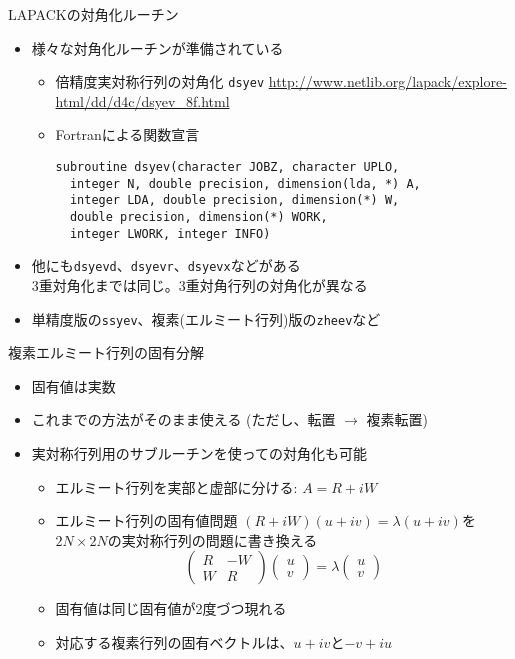 \begin{frame}[t,fragile]{LAPACKの対角化ルーチン}
  \begin{itemize}
  \item 様々な対角化ルーチンが準備されている
    \begin{itemize}
    \item 倍精度実対称行列の対角化 {\tt dsyev}
      \url{http://www.netlib.org/lapack/explore-html/dd/d4c/dsyev_8f.html}
    \item Fortranによる関数宣言
\begin{lstlisting}
subroutine dsyev(character JOBZ, character UPLO,
  integer N, double precision, dimension(lda, *) A,
  integer LDA, double precision, dimension(*) W,
  double precision, dimension(*) WORK,
  integer LWORK, integer INFO)		
\end{lstlisting}
    \end{itemize}
  \item 他にも{\tt dsyevd}、{\tt dsyevr}、{\tt dsyevx}などがある \\
    3重対角化までは同じ。3重対角行列の対角化が異なる
  \item 単精度版の{\tt ssyev}、複素(エルミート行列)版の{\tt zheev}など
  \end{itemize}
\end{frame}

\begin{frame}[t,fragile]{複素エルミート行列の固有分解}
  \begin{itemize}
  \item 固有値は実数
  \item これまでの方法がそのまま使える (ただし、転置 $\rightarrow$ 複素転置)
  \item 実対称行列用のサブルーチンを使っての対角化も可能
    \begin{itemize}
    \item エルミート行列を実部と虚部に分ける: $A = R + iW$
    \item エルミート行列の固有値問題 $(R + iW)(u+iv) = \lambda(u+iv)$を$2N \times 2N$の実対称行列の問題に書き換える
      \[
      \begin{pmatrix} R & -W \\ W & R \end{pmatrix}
      \begin{pmatrix} u \\ v \end{pmatrix}
      = 
      \lambda \begin{pmatrix} u \\ v \end{pmatrix}
      \]
    \item 固有値は同じ固有値が2度づつ現れる
    \item 対応する複素行列の固有ベクトルは、$u+iv$と$-v+iu$
    \end{itemize}
  \end{itemize}
\end{frame}
